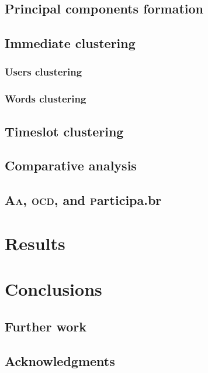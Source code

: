 \documentclass[a4paper, 11pt]{article} %
\newcommand{\ocd}{\textsc{ocd}}
\newcommand{\participa}{\textsc{p}articipa.br}
\newcommand{\aab}{\textsc{aa}}
\newcommand{\aai}{\textsc{Aa}}
\newcommand{\ontologiaa}{\textsc{o}ntologi\textsc{aa}}
\begin{document}
\subsection{Principal components formation}
\subsection{Immediate clustering}
\subsubsection{Users clustering}
\subsubsection{Words clustering}
\subsection{Timeslot clustering}
\subsection{Comparative analysis}
\subsection{\aai, \ocd, and \participa}

\section{Results}\label{sec:res}

\section{Conclusions}\label{sec:con}
\subsection{Further work}
\subsection{Acknowledgments}

\end{document}
